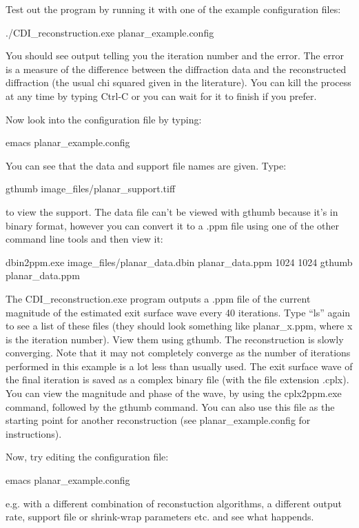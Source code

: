 \documentclass[]{cxs-software}
\begin{document}
Test out the program by running it with one of the example
configuration files: 
\begin{myverbatim}
   ./CDI_reconstruction.exe planar_example.config
\end{myverbatim}
You should see output telling you the iteration number and the
error. The error is a measure of the difference between the
diffraction data and the reconstructed diffraction (the usual chi
squared given in the literature). You can kill the process at any time
by typing Ctrl-C or you can wait for it to finish if you prefer.

Now look into the configuration file by typing: 
\begin{myverbatim}
   emacs planar_example.config 
\end{myverbatim}
You can see that the data and support file names are given. Type: 
\begin{myverbatim}
   gthumb image_files/planar_support.tiff 
\end{myverbatim}
to view the support. The data file can't be viewed with gthumb because
it's in binary format, however you can convert it to a .ppm file using
one of the other command line tools and then view it: 
\begin{myverbatim}
   dbin2ppm.exe image_files/planar_data.dbin planar_data.ppm 1024 1024 
   gthumb planar_data.ppm
\end{myverbatim}

The CDI\_reconstruction.exe program outputs a .ppm file of the current
magnitude of the estimated exit surface wave every 40 iterations. Type
``ls'' again to see a list of these files (they should look something like
planar\_x.ppm, where x is the iteration number). View them using
gthumb. The reconstruction is slowly converging. Note that it may not
completely converge as the number of iterations performed in this
example is a lot less than usually used. The exit surface wave of the
final iteration is saved as a complex binary file (with the file
extension .cplx). You can view the magnitude and phase of the wave, by
using the cplx2ppm.exe command, followed by the gthumb command. You
can also use this file as the starting point for another
reconstruction (see planar\_example.config for instructions).

Now, try editing the configuration file: 
\begin{myverbatim}
   emacs planar_example.config 
\end{myverbatim}
e.g. with a different combination of reconstuction algorithms, a
different output rate, support file or shrink-wrap parameters etc. and
see what happends.
\end{document}
